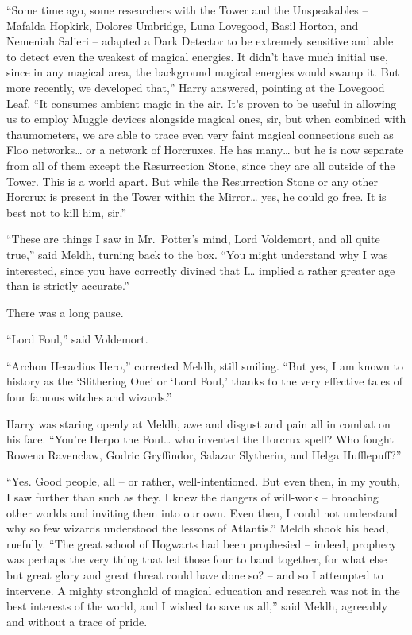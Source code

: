 ``Some time ago, some researchers with the Tower and the Unspeakables --
Mafalda Hopkirk, Dolores Umbridge, Luna Lovegood, Basil Horton, and
Nemeniah Salieri -- adapted a Dark Detector to be extremely sensitive
and able to detect even the weakest of magical energies. It didn't have
much initial use, since in any magical area, the background magical
energies would swamp it. But more recently, we developed that,'' Harry
answered, pointing at the Lovegood Leaf. ``It consumes ambient magic in
the air. It's proven to be useful in allowing us to employ Muggle
devices alongside magical ones, sir, but when combined with
thaumometers, we are able to trace even very faint magical connections
such as Floo networks\ldots{} or a network of Horcruxes. He has
many\ldots{} but he is now separate from all of them except the
Resurrection Stone, since they are all outside of the Tower. This is a
world apart. But while the Resurrection Stone or any other Horcrux is
present in the Tower within the Mirror\ldots{} yes, he could go free. It
is best not to kill him, sir.''

``These are things I saw in Mr.~Potter's mind, Lord Voldemort, and all
quite true,'' said Meldh, turning back to the box. ``You might
understand why I was interested, since you have correctly divined that
I\ldots{} implied a rather greater age than is strictly accurate.''

There was a long pause.

``Lord Foul,'' said Voldemort.

``Archon Heraclius Hero,'' corrected Meldh, still smiling. ``But yes, I
am known to history as the `Slithering One' or `Lord Foul,' thanks to
the very effective tales of four famous witches and wizards.''

Harry was staring openly at Meldh, awe and disgust and pain all in
combat on his face. ``You're Herpo the Foul\ldots{} who invented the
Horcrux spell? Who fought Rowena Ravenclaw, Godric Gryffindor, Salazar
Slytherin, and Helga Hufflepuff?''

``Yes. Good people, all -- or rather, well-intentioned. But even then,
in my youth, I saw further than such as they. I knew the dangers of
will-work -- broaching other worlds and inviting them into our own. Even
then, I could not understand why so few wizards understood the lessons
of Atlantis.'' Meldh shook his head, ruefully. ``The great school of
Hogwarts had been prophesied -- indeed, prophecy was perhaps the very
thing that led those four to band together, for what else but great
glory and great threat could have done so? -- and so I attempted to
intervene. A mighty stronghold of magical education and research was not
in the best interests of the world, and I wished to save us all,'' said
Meldh, agreeably and without a trace of pride.

